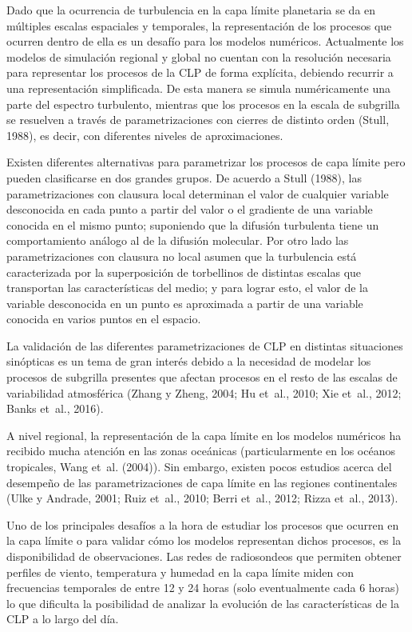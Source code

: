 \documentclass[12pt,spanish,oneside]{book}
\begin{document}
Dado que la ocurrencia de turbulencia en la capa límite planetaria se da
en múltiples escalas espaciales y temporales, la representación de los
procesos que ocurren dentro de ella es un desafío para los modelos
numéricos. Actualmente los modelos de simulación regional y global no
cuentan con la resolución necesaria para representar los procesos de la
CLP de forma explícita, debiendo recurrir a una representación
simplificada. De esta manera se simula numéricamente una parte del
espectro turbulento, mientras que los procesos en la escala de subgrilla
se resuelven a través de parametrizaciones con cierres de distinto orden
(Stull, 1988), es decir, con diferentes niveles de aproximaciones.

Existen diferentes alternativas para parametrizar los procesos de capa
límite pero pueden clasificarse en dos grandes grupos. De acuerdo a
Stull (1988), las parametrizaciones con clausura local determinan el
valor de cualquier variable desconocida en cada punto a partir del valor
o el gradiente de una variable conocida en el mismo punto; suponiendo
que la difusión turbulenta tiene un comportamiento análogo al de la
difusión molecular. Por otro lado las parametrizaciones con clausura no
local asumen que la turbulencia está caracterizada por la superposición
de torbellinos de distintas escalas que transportan las características
del medio; y para lograr esto, el valor de la variable desconocida en un
punto es aproximada a partir de una variable conocida en varios puntos
en el espacio.

La validación de las diferentes parametrizaciones de CLP en distintas
situaciones sinópticas es un tema de gran interés debido a la necesidad
de modelar los procesos de subgrilla presentes que afectan procesos en
el resto de las escalas de variabilidad atmosférica (Zhang y Zheng,
2004; Hu et~al., 2010; Xie et~al., 2012; Banks et~al., 2016).


A nivel regional, la representación de la capa límite en los modelos
numéricos ha recibido mucha atención en las zonas oceánicas
(particularmente en los océanos tropicales, Wang et~al. (2004)). Sin
embargo, existen pocos estudios acerca del desempeño de las
parametrizaciones de capa límite en las regiones continentales (Ulke y
Andrade, 2001; Ruiz et~al., 2010; Berri et~al., 2012; Rizza et~al.,
2013).

Uno de los principales desafíos a la hora de estudiar los procesos que
ocurren en la capa límite o para validar cómo los modelos representan
dichos procesos, es la disponibilidad de observaciones. Las redes de
radiosondeos que permiten obtener perfiles de viento, temperatura y
humedad en la capa límite miden con frecuencias temporales de entre 12 y
24 horas (solo eventualmente cada 6 horas) lo que dificulta la
posibilidad de analizar la evolución de las características de la CLP a
lo largo del día.
\end{document}
